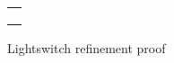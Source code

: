 \begin{figure}
\centering
\begin{tabular}{c}
\hline \\
 \\ \\
\hline
\end{tabular}
\caption{Lightswitch refinement proof}
\label{fig:lightswitch-proof}
\end{figure}
